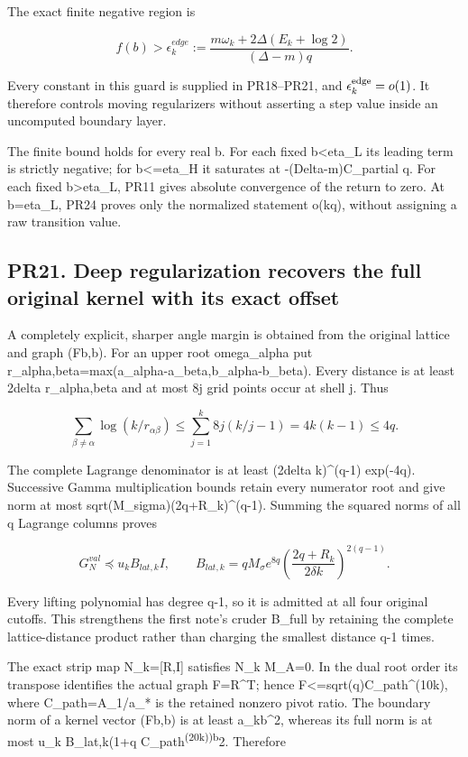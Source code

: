 \documentclass[11pt]{article}
\begin{document}
The exact finite negative region is

\[
f(b)>\epsilon_k^{edge}:=
\frac{m\omega_k+2\Delta(E_k+\log2)}{(\Delta-m)q}.
\tag{PR28a}
\]

Every constant in this guard is supplied in PR18--PR21, and \(\epsilon_k^{\rm edge}=o(1)\). It therefore controls moving regularizers without asserting a step value inside an uncomputed boundary layer.

The finite bound holds for every real b. For each fixed b\textless eta\_L its leading term is strictly negative; for b\textless=eta\_H it saturates at -(Delta-m)C\_partial q. For each fixed b\textgreater eta\_L, PR11 gives absolute convergence of the return to zero. At b=eta\_L, PR24 proves only the normalized statement o(kq), without assigning a raw transition value.

\subsection{PR21. Deep regularization recovers the full original kernel with its exact offset}\label{pr21.-deep-regularization-recovers-the-full-original-kernel-with-its-exact-offset}

A completely explicit, sharper angle margin is obtained from the original lattice and graph (Fb,b). For an upper root omega\_alpha put r\_alpha,beta=max(\textbar a\_alpha-a\_beta\textbar,\textbar b\_alpha-b\_beta\textbar). Every distance is at least 2delta r\_alpha,beta and at most 8j grid points occur at shell j. Thus

\[
\sum_{\beta\ne\alpha}\log(k/r_{\alpha\beta})
\le\sum_{j=1}^k8j(k/j-1)=4k(k-1)\le4q.
\]

The complete Lagrange denominator is at least (2delta k)\^{}(q-1) exp(-4q). Successive Gamma multiplication bounds retain every numerator root and give norm at most sqrt(M\_sigma)(2q+R\_k)\^{}(q-1). Summing the squared norms of all q Lagrange columns proves

\[
G_N^{val}\preceq u_k B_{lat,k}I,\qquad
\boxed{
B_{lat,k}=qM_\sigma e^{8q}
\left(\frac{2q+R_k}{2\delta k}\right)^{2(q-1)}.
}
\tag{PR29a}
\]

Every lifting polynomial has degree q-1, so it is admitted at all four original cutoffs. This strengthens the first note's cruder B\_full by retaining the complete lattice-distance product rather than charging the smallest distance q-1 times.

The exact strip map N\_k={[}R,I{]} satisfies N\_k M\_A=0. In the dual root order its transpose identifies the actual graph F=R\^{}T; hence \textbar\textbar F\textbar\textbar\textless=sqrt(q)C\_path\^{}(10k), where C\_path=A\_1/\textbar a\_*\textbar{} is the retained nonzero pivot ratio. The boundary norm of a kernel vector (Fb,b) is at least a\_k\textbar\textbar b\textbar\textbar\^{}2, whereas its full norm is at most u\_k B\_lat,k(1+q C\_path\textsuperscript{(20k))\textbar\textbar b\textbar\textbar{}}2. Therefore
\end{document}
